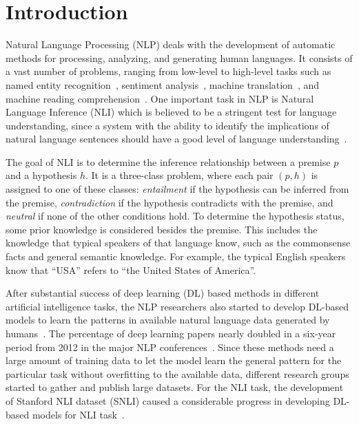 \documentclass[preprint,12pt]{elsarticle}
\begin{document}
\section{Introduction}
\label{sec:introduction}
Natural Language Processing (NLP) deals with the development of automatic methods for processing, analyzing, and generating human languages. It consists of a vast number of problems, ranging from low-level to high-level tasks such as named entity recognition~\citep{yadav2019survey}, sentiment analysis~\citep{keramatfar2019bibliometrics}, machine translation~\citep{yang2020survey}, and machine reading comprehension~\citep{baradaran2020survey}. One important task in NLP is Natural Language Inference (NLI) which is believed to be a stringent test for language understanding, since a system with the ability to identify the implications of natural language sentences should have a good level of language understanding~\citep{maccartney2009natural}.

The goal of NLI is to determine the inference relationship between a premise $p$ and a hypothesis $h$. It is a three-class problem, where each pair $(p,h)$ is assigned to one of these classes: \textit{entailment} if the hypothesis can be inferred from the premise, \textit{contradiction} if the hypothesis contradicts with the premise, and \textit{neutral} if none of the other conditions hold. To determine the hypothesis status, some prior knowledge is considered besides the premise. This includes the knowledge that typical speakers of that language know, such as the commonsense facts and general semantic knowledge. For example, the typical English speakers know that “USA” refers to “the United States of America”.

After substantial success of deep learning (DL) based methods in different artificial intelligence tasks, the NLP researchers also started to develop DL-based models to learn the patterns in available natural language data generated by humans~\citep{otter2020survey}.  The percentage of deep learning papers nearly doubled in a six-year period from 2012 in the major NLP conferences~\citep{young2018recent}. Since these methods need a large amount of training data to let the model learn the general pattern for the particular task without overfitting to the available data, different research groups started to gather and publish large datasets. For the NLI task, the development of Stanford NLI dataset (SNLI) caused a considerable progress in developing DL-based models for NLI task~\citep{bowman2015large}.
\end{document}
